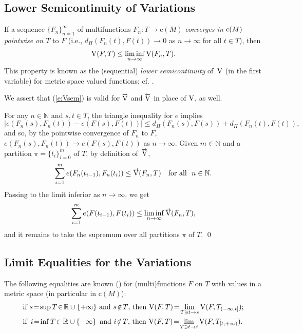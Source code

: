 \documentclass[preprint,12pt]{elsarticle}
\newcommand{\eq}[1]{\mbox{\rm(\ref{#1})}}
\newcommand{\Rb}{\mathbb{R}}  \newcommand{\Nb}{\mathbb{N}}
\newcommand{\nV}{\mbox{\rm V}}
\newcommand{\riV}{{\scriptstyle\overrightarrow{\mbox{\rm V}}}}
\newcommand{\leV}{{\scriptstyle\overleftarrow{\mbox{\rm V}}}}
\begin{document}
\subsection{Lower Semicontinuity of Variations} \label{ss:lsc}

If a sequence $\{F_n\}_{n=1}^\infty$ of multifunctions $F_n:T\to\mbox{c}(M)$
\emph{converges in $\mbox{\rm c}(M)$ pointwise on $T$} to $F$ (i.e.,
$d_H(F_n(t),F(t))\to0$ as $n\to\infty$ for all $t\in T$), then
  \begin{equation} \label{e:Vsem}
\nV(F,T)\le\liminf_{n\to\infty}\nV(F_n,T).
  \end{equation}
This property is known as the (sequential) \emph{lower semicontinuity\/} of~$\nV$
(in the first variable) for metric space valued functions; cf. \cite[Proposition~2.1(V7)]{MatSb}.

\smallbreak
We assert that \eq{e:Vsem} is valid for $\riV$ and $\leV$ in place of $\nV$, as well.

\begin{pflsc}
For any $n\in\Nb$ and $s,t\in T$, the triangle inequality for $e$ implies
  \begin{equation*}
|e(F_n(s),F_n(t))-e(F(s),F(t))|\le d_H(F_n(s),F(s))+d_H(F_n(t),F(t)),
  \end{equation*}
and so, by the pointwise convergence of $F_n$ to $F$, $e(F_n(s),F_n(t))\!\to\! e(F(s),F(t))$
as $n\to\infty$. Given $m\in\Nb$ and a partition $\pi=\{t_i\}_{i=0}^m$ of $T$,
by definition of~$\riV$,
  \begin{equation*}
\sum_{i=1}^m e(F_n(t_{i-1}),F_n(t_i))\le\riV(F_n,T)\quad\mbox{for all \,\,$n\in\Nb$.}
  \end{equation*}
Passing to the limit inferior as $n\to\infty$, we get
  \begin{equation*}
\sum_{i=1}^m e(F(t_{i-1}),F(t_i))\le\liminf_{n\to\infty}\riV(F_n,T),
  \end{equation*}
and it remains to take the supremum over all partitions $\pi$ of $T$.
\qed\end{pflsc}

\subsection{Limit Equalities for the Variations}

The following equalities are known (\cite{Var,JDCS}) for (multi)functions $F$ on $T$
with values in a metric space (in particular in $\mbox{c}(M)$):
  \begin{align}
&\mbox{if $s\!=\!\sup T\!\in\!\Rb\cup\{+\infty\}$ and $s\!\notin\! T$, then
  $\displaystyle\nV(F,T)\!=\!\lim_{T\ni t\to s}\nV(F,T_{(-\infty,t]});$} \label{e:ttos}\\
&\mbox{if \,$i\!=\!\inf T\!\in\Rb\cup\{-\infty\}$ \,and $i\!\notin\! T$, then
  $\displaystyle\nV(F,T)\!=\!\lim_{T\ni t\to i}\nV(F,T_{[t,+\infty)}).$}\label{e:ttoi}
  \end{align}
\end{document}
